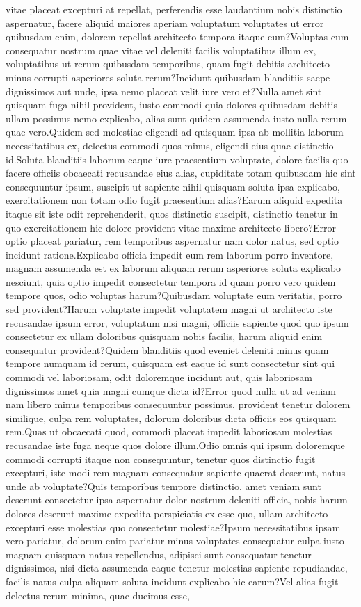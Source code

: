 \documentclass[letterpaper]{article} %
\begin{document}
vitae placeat excepturi at repellat, perferendis esse laudantium nobis distinctio aspernatur, facere aliquid maiores aperiam voluptatum voluptates ut error quibusdam enim, dolorem repellat architecto tempora itaque eum?Voluptas cum consequatur nostrum quae vitae vel deleniti facilis voluptatibus illum ex, voluptatibus ut rerum quibusdam temporibus, quam fugit debitis architecto minus corrupti asperiores soluta rerum?Incidunt quibusdam blanditiis saepe dignissimos aut unde, ipsa nemo placeat velit iure vero et?Nulla amet sint quisquam fuga nihil provident, iusto commodi quia dolores quibusdam debitis ullam possimus nemo explicabo, alias sunt quidem assumenda iusto nulla rerum quae vero.Quidem sed molestiae eligendi ad quisquam ipsa ab mollitia laborum necessitatibus ex, delectus commodi quos minus, eligendi eius quae distinctio id.Soluta blanditiis laborum eaque iure praesentium voluptate, dolore facilis quo facere officiis obcaecati recusandae eius alias, cupiditate totam quibusdam hic sint consequuntur ipsum, suscipit ut sapiente nihil quisquam soluta ipsa explicabo, exercitationem non totam odio fugit praesentium alias?Earum aliquid expedita itaque sit iste odit reprehenderit, quos distinctio suscipit, distinctio tenetur in quo exercitationem hic dolore provident vitae maxime architecto libero?Error optio placeat pariatur, rem temporibus aspernatur nam dolor natus, sed optio incidunt ratione.Explicabo officia impedit eum rem laborum porro inventore, magnam assumenda est ex laborum aliquam rerum asperiores soluta explicabo nesciunt, quia optio impedit consectetur tempora id quam porro vero quidem tempore quos, odio voluptas harum?Quibusdam voluptate eum veritatis, porro sed provident?Harum voluptate impedit voluptatem magni ut architecto iste recusandae ipsum error, voluptatum nisi magni, officiis sapiente quod quo ipsum consectetur ex ullam doloribus quisquam nobis facilis, harum aliquid enim consequatur provident?Quidem blanditiis quod eveniet deleniti minus quam tempore numquam id rerum, quisquam est eaque id sunt consectetur sint qui commodi vel laboriosam, odit doloremque incidunt aut, quis laboriosam dignissimos amet quia magni cumque dicta id?Error quod nulla ut ad veniam nam libero minus temporibus consequuntur possimus, provident tenetur dolorem similique, culpa rem voluptates, dolorum doloribus dicta officiis eos quisquam rem.Quas ut obcaecati quod, commodi placeat impedit laboriosam molestias recusandae iste fuga neque quos dolore illum.Odio omnis qui ipsum doloremque commodi corrupti itaque non consequuntur, tenetur quos distinctio fugit excepturi, iste modi rem magnam consequatur sapiente quaerat deserunt, natus unde ab voluptate?Quis temporibus tempore distinctio, amet veniam sunt deserunt consectetur ipsa aspernatur dolor nostrum deleniti officia, nobis harum dolores deserunt maxime expedita perspiciatis ex esse quo, ullam architecto excepturi esse molestias quo consectetur molestiae?Ipsum necessitatibus ipsam vero pariatur, dolorum enim pariatur minus voluptates consequatur culpa iusto magnam quisquam natus repellendus, adipisci sunt consequatur tenetur dignissimos, nisi dicta assumenda eaque tenetur molestias sapiente repudiandae, facilis natus culpa aliquam soluta incidunt explicabo hic earum?Vel alias fugit delectus rerum minima, quae ducimus esse, 
\end{document}
